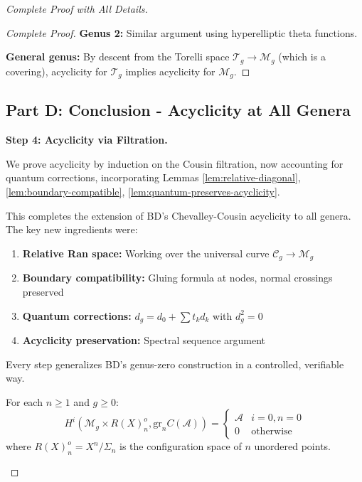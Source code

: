 \begin{proof}[Complete Proof with All Details]
\begin{proof}[Complete Proof]
\textbf{Genus 2:} Similar argument using hyperelliptic theta functions.

\textbf{General genus:} By descent from the Torelli space $\mathcal{T}_g \to \mathcal{M}_g$ (which is a covering), acyclicity for $\mathcal{T}_g$ implies acyclicity for $\mathcal{M}_g$.
\end{proof}

\subsection*{Part D: Conclusion - Acyclicity at All Genera}

\textbf{Step 4: Acyclicity via Filtration.}

We prove acyclicity by induction on the Cousin filtration, now accounting for quantum corrections, incorporating Lemmas \ref{lem:relative-diagonal}, \ref{lem:boundary-compatible}, \ref{lem:quantum-preserves-acyclicity}.

\begin{remark}\label{rem:summary-higher-genus}
This completes the extension of BD's Chevalley-Cousin acyclicity to all genera. The key new ingredients were:
\begin{enumerate}
\item \textbf{Relative Ran space:} Working over the universal curve $\mathcal{C}_g \to \mathcal{M}_g$
\item \textbf{Boundary compatibility:} Gluing formula at nodes, normal crossings preserved
\item \textbf{Quantum corrections:} $d_g = d_0 + \sum t_k d_k$ with $d_g^2 = 0$
\item \textbf{Acyclicity preservation:} Spectral sequence argument
\end{enumerate}

Every step generalizes BD's genus-zero construction in a controlled, verifiable way.
\end{remark}

\begin{lemma}\label{lem:graded-acyclic}
For each $n \geq 1$ and $g \geq 0$:
$$H^i(\mathcal{M}_g \times R(X)_n^o, \text{gr}_n C(\mathcal{A})) = 
\begin{cases}
\mathcal{A} & i=0, n=0 \\
0 & \text{otherwise}
\end{cases}$$
where $R(X)_n^o = X^n / \Sigma_n$ is the configuration space of $n$ unordered points.
\end{lemma}


\end{proof}
